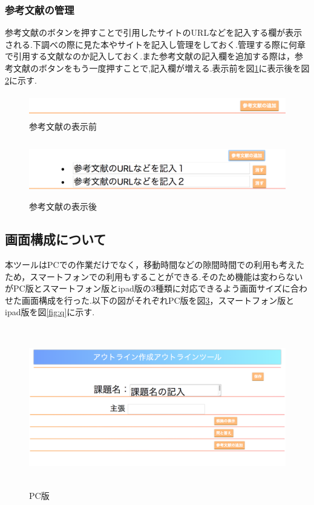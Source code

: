 \documentclass[a4j,12pt]{jarticle}
\begin{document}
\subsubsection{参考文献の管理}
参考文献のボタンを押すことで引用したサイトのURLなどを記入する欄が表示される.下調べの際に見た本やサイトを記入し管理をしておく.管理する際に何章で引用する文献なのか記入しておく.また参考文献の記入欄を追加する際は，参考文献のボタンをもう一度押すことで,記入欄が増える.表示前を図\ref{fig:n}に表示後を図\ref{fig:o}に示す.

\begin{figure}[h]
\begin{center}
 \includegraphics[clip,width=150mm,height=10mm]{figure/06sankou.png}
\end{center}
 \caption{参考文献の表示前}
 \label{fig:n}
\end{figure}

\begin{figure}[h]
\begin{center}
 \includegraphics[clip,width=150mm,height=25mm]{figure/07sankou.png}
\end{center}
 \caption{参考文献の表示後}
 \label{fig:o}
\end{figure}

\newpage
\subsection{画面構成について}
本ツールはPCでの作業だけでなく，移動時間などの隙間時間での利用も考えたため，スマートフォンでの利用もすることができる.そのため機能は変わらないがPC版とスマートフォン版とipad版の3種類に対応できるよう画面サイズに合わせた画面構成を行った.以下の図がそれぞれPC版を図\ref{fig:p}，スマートフォン版とipad版を図\ref{fig:q}に示す.
\begin{figure}[h]
\begin{center}
 \includegraphics[clip,width=130mm,height=70mm]{figure/08gamen.png}
\end{center}
 \caption{PC版}
 \label{fig:p}
\end{figure}
\end{document}
